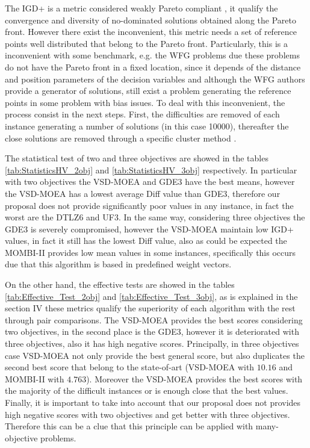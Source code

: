 The IGD+ is a metric considered weakly Pareto compliant \cite{Joel:Inverted_Generational_Distance_Plus}, it qualify the convergence and diversity of no-dominated solutions obtained along the Pareto front.
%
However there exist the inconvenient, this metric needs a set of reference points well distributed that belong to the Pareto front.
%
Particularly, this is a inconvenient with some benchmark, e.g. the WFG problems due these problems do not have the Pareto front in a fixed location, since it depends of the distance and position parameters of the decision variables and although the WFG authors provide a generator of solutions, still exist a problem generating the reference points in some problem with bias issues. 
%
To deal with this inconvenient, the process consist in the next steps. First, the difficulties are removed of each instance generating a number of solutions (in this case 10000), thereafter the close solutions are removed through a specific cluster method .

%
The statistical test of two and three objectives are showed in the tables \ref{tab:StatisticsHV_2obj} and \ref{tab:StatisticsHV_3obj} respectively.
%
In particular with two objectives the VSD-MOEA and GDE3 have the best means, however the VSD-MOEA has a lowest average Diff value than GDE3, therefore our proposal does not provide significantly poor values in any instance, in fact the worst are the DTLZ6 and UF3.
%
In the same way, considering three objectives the GDE3 is severely compromised, however the VSD-MOEA maintain low IGD+ values, in fact it still has the lowest Diff value, also as could be expected the MOMBI-II provides low mean values in some instances, specifically this occurs due that this algorithm is based in predefined weight vectors.
%

On the other hand, the effective tests are showed in the tables \ref{tab:Effective_Test_2obj} and \ref{tab:Effective_Test_3obj}, as is explained in the section IV these metrics qualify the superiority of each algorithm with the rest through pair comparisons.
%
The VSD-MOEA provides the best scores considering two objectives, in the second place is the GDE3, however it is deteriorated with three objectives, also it has high negative scores.
%
Principally, in three objectives case VSD-MOEA not only provide the best general score, but also duplicates the second best score that belong to the state-of-art (VSD-MOEA with $10.16$ and MOMBI-II with $4.763$).
%
Moreover the VSD-MOEA provides the best scores with the majority of the difficult instances or is enough close that the best values.
%
Finally, it is important to take into account that our proposal does not provides high negative scores with two objectives and get better with three objectives.
%
Therefore this can be a clue that this principle can be applied with many-objective problems.

